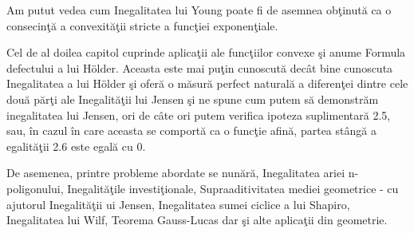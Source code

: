 \documentclass[a4paper,12pt,oneside]{report}
\begin{document}
 Am putut vedea cum Inegalitatea lui Young poate fi de asemnea ob\c{t}inut\u{a} ca o consecin\c{t}\u{a} a convexit\u{a}\c{t}ii stricte a func\c{t}iei exponen\c{t}iale.

Cel de al doilea capitol cuprinde aplica\c{t}ii ale func\c{t}iilor convexe \c{s}i anume Formula defectului a lui Hölder. Aceasta este mai pu\c{t}in cunoscut\u{a} dec\^{a}t bine cunoscuta Inegalitatea a lui Hölder \c{s}i ofer\u{a} o m\u{a}sur\u{a} perfect natural\u{a} a diferen\c{t}ei dintre cele dou\u{a} p\u{a}r\c{t}i ale Inegalit\u{a}\c{t}ii lui Jensen \c{s}i ne spune cum putem s\u{a} demonstr\u{a}m inegalitatea lui Jensen, ori de c\^{a}te ori putem verifica ipoteza suplimentar\u{a} 2.5, sau, \^{i}n cazul \^{i}n care aceasta se comport\u{a} ca o func\c{t}ie afin\u{a}, partea st\^{a}ng\u{a} a egalit\u{a}\c{t}ii 2.6 este egal\u{a} cu 0.

De asemenea, printre probleme abordate se nun\u{a}r\u{a}, Inegalitatea ariei n-poligonului, Inegalit\u{a}\c{t}ile investi\c{t}ionale, Supraaditivitatea mediei geometrice - cu ajutorul Inegalit\u{a}\c{t}ii ui Jensen, Inegalitatea sumei ciclice a lui Shapiro, Inegalitatea lui Wilf, Teorema Gauss-Lucas dar \c{s}i alte aplica\c{t}ii din geometrie.








\setlength{\baselineskip}{\normalbaselineskip}
\setlength{\parskip}{0pt}

\end{document}
